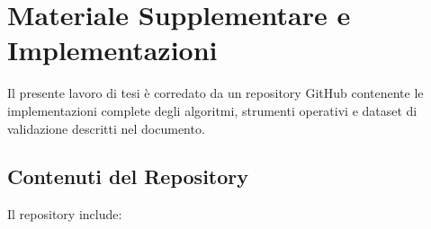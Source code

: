 
\section*{Materiale Supplementare e Implementazioni}

Il presente lavoro di tesi è corredato da un repository GitHub contenente le implementazioni complete degli algoritmi, strumenti operativi e dataset di validazione descritti nel documento.

\begin{center}
\end{center}

\subsection*{Contenuti del Repository}

Il repository include:

